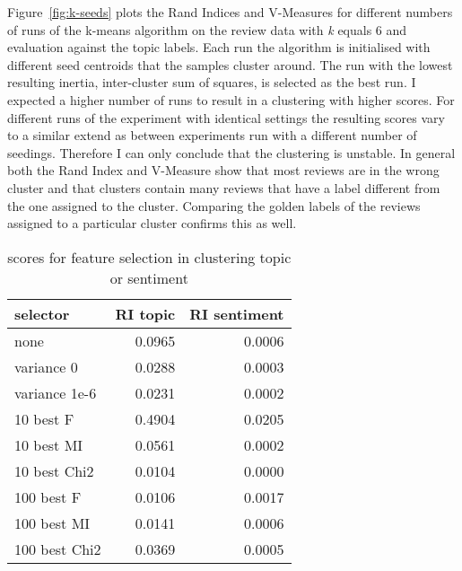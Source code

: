 \documentclass[11pt]{article}
\begin{document}
Figure~\ref{fig:k-seeds} plots the Rand Indices and V-Measures for different numbers of runs of the k-means algorithm on the review data with \emph{k} equals 6 and evaluation against the topic labels. Each run the algorithm is initialised with different seed centroids that the samples cluster around. The run with the lowest resulting inertia, inter-cluster sum of squares, is selected as the best run. I expected a higher number of runs to result in a clustering with higher scores. For different runs of the experiment with identical settings the resulting scores vary to a similar extend as between experiments run with a different number of seedings. Therefore I can only conclude that the clustering is unstable. In general both the Rand Index and V-Measure show that most reviews are in the wrong cluster and that clusters contain many reviews that have a label different from the one assigned to the cluster. Comparing the golden labels of the reviews assigned to a particular cluster confirms this as well.

\begin{table}[ht]\footnotesize
\centering
\caption{scores for feature selection in clustering topic or sentiment}
\label{tab:clust-select}
\begin{tabular}{ l r r }
selector & RI topic & RI sentiment \\
\hline
none           & 0.0965 & 0.0006 \\
variance 0     & 0.0288 & 0.0003 \\
variance 1e-6  & 0.0231 & 0.0002 \\
10  best F     & 0.4904 & 0.0205 \\
10  best MI    & 0.0561 & 0.0002 \\
10  best Chi2  & 0.0104 & 0.0000 \\
100 best F     & 0.0106 & 0.0017 \\
100 best MI    & 0.0141 & 0.0006 \\
100 best Chi2  & 0.0369 & 0.0005 \\
\end{tabular}
\end{table}
\end{document}

